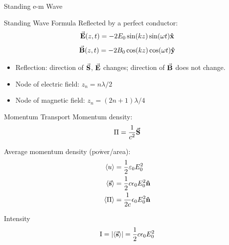 \documentclass{beamer}
\begin{document}
\begin{frame}{Standing e-m Wave}
    \begin{beamerboxesrounded}[shadow=true]{Standing Wave Formula}
        Reflected by a perfect conductor:
        \begin{equation}
            \va{E}(z, t) = -2E_0 \sin(kz) \sin(\omega t) \vu{x}
        \end{equation}
        \begin{equation}
            \va{B}(z, t) = -2B_0 \cos(kz) \cos(\omega t) \vu{y}
        \end{equation}
    \end{beamerboxesrounded}
    \vspace{.5em}
    \begin{itemize}
        \item Reflection: direction of $\va{S}$, $\va{E}$ changes; direction of $\va{B}$ does not change.
        \item Node of electric field: $z_n = n \lambda/2$
        \item Node of magnetic field: $z_n = (2n+1)\lambda/4$
    \end{itemize}
\end{frame}



\begin{frame}{Momentum Transport}
    Momentum density: 
    \begin{equation}
        \textbf{$\Pi$} = \frac{1}{c^2}\va{S}
    \end{equation}

    Average momentum density ($\overline{\text{power}}$/area):
    \begin{equation}
        \begin{split}
            \langle u\rangle&=\frac{1}{2} \varepsilon_{0} E_{0}^{2} \\
            \langle \va{s} \rangle &= \frac{1}{2}c\epsilon_0E^2_0 \vu{n} \\ 
            \langle \textbf{$\Pi$} \rangle&= \frac{1}{2c}\epsilon_0 E^2_0 \vu{n}
        \end{split}
    \end{equation}

    \begin{beamerboxesrounded}[shadow=true]{Intensity}
        \begin{equation}
            \text{I} = \abs{\langle \va{s} \rangle} = \frac{1}{2} c \epsilon_0 E^2_0
        \end{equation}        
    \end{beamerboxesrounded}
    \vspace{.5em}

\end{frame}
\end{document}
